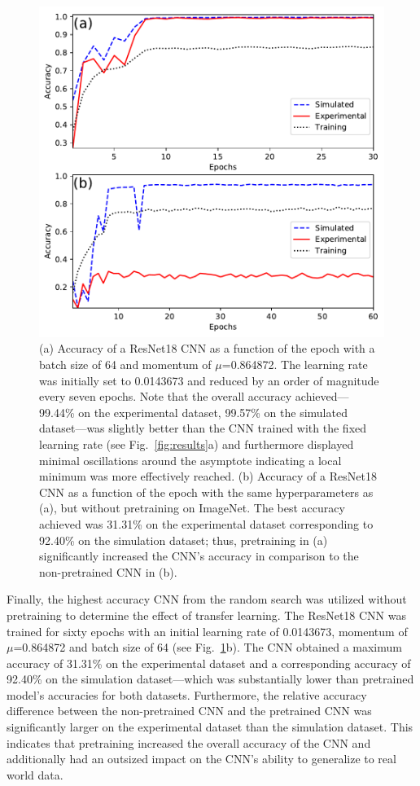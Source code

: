 \documentclass[10pt,journal,compsoc]{IEEEtran}
\begin{document}
\begin{figure}%
\centering %
\includegraphics[width=.5\textwidth]{results2.pdf} %
\caption[Table of Contents Figure Caption]{(a) Accuracy of a ResNet18 CNN as a function of the epoch with a batch size of 64 and momentum of $\mu$=0.864872. The learning rate was initially set to 0.0143673 and reduced by an order of magnitude every seven epochs. Note that the overall accuracy achieved---99.44\% on the experimental dataset, 99.57\% on the simulated dataset---was slightly better than the CNN trained with the fixed learning rate (see Fig.~\ref{fig:results}a) and furthermore displayed minimal oscillations around the asymptote indicating a local minimum was more effectively reached. (b) Accuracy of a ResNet18 CNN as a function of the epoch with the same hyperparameters as (a), but without pretraining on ImageNet. The best accuracy achieved was 31.31\% on the experimental dataset corresponding to 92.40\% on the simulation dataset; thus, pretraining in (a) significantly increased the CNN's accuracy in comparison to the non-pretrained CNN in (b).} %
\label{fig:results2} %
\end{figure}

Finally, the highest accuracy CNN from the random search was utilized without pretraining to determine the effect of transfer learning. The ResNet18 CNN was trained for sixty epochs with an initial learning rate of 0.0143673, momentum of $\mu$=0.864872 and batch size of 64 (see Fig.~\ref{fig:results2}b). The CNN obtained a maximum accuracy of 31.31\% on the experimental dataset and a corresponding accuracy of 92.40\% on the simulation dataset---which was substantially lower than pretrained model's accuracies for both datasets. Furthermore, the relative accuracy difference between the non-pretrained CNN and the pretrained CNN was significantly larger on the experimental dataset than the simulation dataset. This indicates that pretraining increased the overall accuracy of the CNN and additionally had an outsized impact on the CNN's ability to generalize to real world data.
\end{document}
